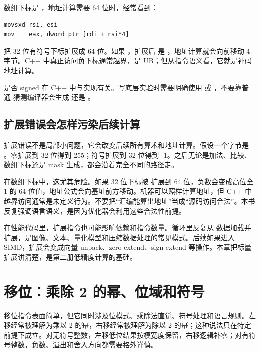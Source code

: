 数组下标是 ，地址计算需要 64 位时，经常看到：

\begin{lstlisting}
movsxd rsi, esi
mov    eax, dword ptr [rdi + rsi*4]
\end{lstlisting}

 把 32 位有符号下标扩展成 64 位。如果 ，扩展后  是 ，地址计算就会向前移动 4 字节。C++ 中真正访问负下标通常越界，是 UB；但从指令语义看，它就是补码地址计算。

\begin{warningbox}
 是否 signed 在 C++ 中与实现有关。写底层实验时需要明确使用  或 ，不要靠普通  猜测编译器会生成  还是 。
\end{warningbox}

\subsection{扩展错误会怎样污染后续计算}

扩展错误不是局部小问题，它会改变后续所有算术和地址计算。假设一个字节是 。零扩展到 32 位得到 255；符号扩展到 32 位得到 -1。之后无论是加法、比较、数组下标还是 mask 生成，都会沿着完全不同的路径走。

在数组下标中，这尤其危险。如果 32 位下标被  扩展到 64 位，负数会变成高位全 1 的 64 位值，地址公式会向基址前方移动。机器可以照样计算地址，但 C++ 中越界访问通常是未定义行为。不要把“汇编能算出地址”当成“源码访问合法”。本书反复强调语言语义，是因为优化器会利用这些合法性前提。

在性能代码里，扩展指令也可能影响依赖和指令数量。循环里反复从  数据加载并扩展，是图像、文本、量化模型和压缩数据处理的常见模式。后续如果进入 SIMD，扩展会变成向量 unpack、zero extend、sign extend 等操作。本章把标量扩展讲清楚，是第二册低精度计算的基础。

\section{移位：乘除 2 的幂、位域和符号}

移位指令表面简单，但它同时涉及位模式、乘除法直觉、符号处理和语言规则。左移经常被理解为乘以 2 的幂，右移经常被理解为除以 2 的幂；这种说法只在特定前提下成立。对无符号整数，左移低位结果按模宽度保留，右移逻辑补零；对有符号整数，负数、溢出和舍入方向都需要格外谨慎。

